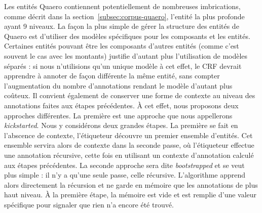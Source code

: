 \documentclass[PhD-Yoann-Dupont.tex]{subfiles}
\begin{document}
Les entités Quaero contiennent potentiellement de nombreuses imbrications, comme décrit dans la section\ \ref{subsec:corpus-quaero}, l'entité la plus profonde ayant 9 niveaux. La façon la plus simple de gérer la structure des entités de Quaero est d'utiliser des modèles spécifiques pour les composants et les entités. Certaines entités pouvant être les composants d'autres entités (comme c'est souvent le cas avec les montants) justifie d'autant plus l'utilisation de modèles séparés : si nous n'utilisions qu'un unique modèle à cet effet, le CRF devrait apprendre à annoter de façon différente la même entité, sans compter l'augmentation du nombre d'annotations rendant le modèle d'autant plus coûteux. Il convient également de conserver une forme de contexte au niveau des annotations faites aux étapes précédentes. À cet effet, nous proposons deux approches différentes. La première est une approche que nous appellerons \emph{kickstarted}. Nous y considérons deux grandes étapes. La première se fait en l'abscence de contexte, l'étiqueteur découvre un premier ensemble d'entités. Cet ensemble servira alors de contexte dans la seconde passe, où l'étiqueteur effectue une annotation récursive, cette fois en utilisant un contexte d'annotation calculé aux étapes précédentes. La seconde approche sera dite \emph{bootstrapped} et se veut plus simple : il n'y a qu'une seule passe, celle récursive. L'algorithme apprend alors directement la récursion et ne garde en mémoire que les annotations de plus haut niveau. À la première étape, la mémoire est vide et est remplie d'une valeur spécifique pour signaler que rien n'a encore été trouvé. %
\end{document}
